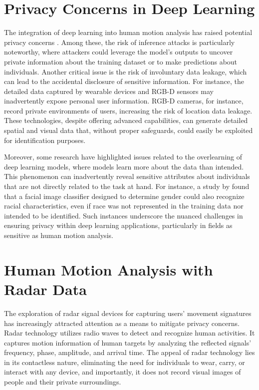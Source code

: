 \documentclass{l4proj}
\begin{document}
\section{Privacy Concerns in Deep Learning}
The integration of deep learning into human motion analysis has raised potential privacy concerns \citep{leakage_privacy_inference_time}. Among these, the risk of inference attacks is particularly noteworthy, where attackers could leverage the model's outputs to uncover private information about the training dataset or to make predictions about individuals. Another critical issue is the risk of involuntary data leakage, which can lead to the accidental disclosure of sensitive information. For instance, the detailed data captured by wearable devices and RGB-D sensors may inadvertently expose personal user information. RGB-D cameras, for instance, record private environments of users, increasing the risk of location data leakage. These technologies, despite offering advanced capabilities, can generate detailed spatial and visual data that, without proper safeguards, could easily be exploited for identification purposes.

Moreover, some research have highlighted issues related to the overlearning of deep learning models, where models learn more about the data than intended. This phenomenon can inadvertently reveal sensitive attributes about individuals that are not directly related to the task at hand. For instance, a study by \cite{overlearning_reveals_sensitive_attributes} found that a facial image classifier designed to determine gender could also recognize racial characteristics, even if race was not represented in the training data nor intended to be identified. Such instances underscore the nuanced challenges in ensuring privacy within deep learning applications, particularly in fields as sensitive as human motion analysis.

\section{Human Motion Analysis with Radar Data}
The exploration of radar signal devices for capturing users' movement signatures has increasingly attracted attention as a means to mitigate privacy concerns. Radar technology utilizes radio waves to detect and recognize human activities. It captures motion information of human targets by analyzing the reflected signals' frequency, phase, amplitude, and arrival time. The appeal of radar technology lies in its contactless nature, eliminating the need for individuals to wear, carry, or interact with any device, and importantly, it does not record visual images of people and their private surroundings.
\end{document}
